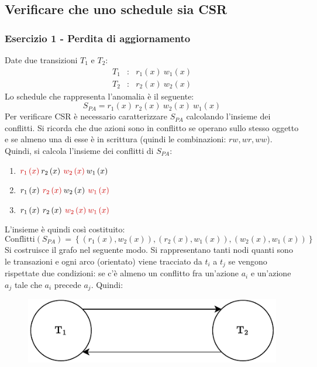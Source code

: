 \documentclass[a4paper]{article}
\begin{document}
	\subsection{Verificare che uno schedule sia CSR}
	
	\subsubsection{Esercizio 1 - Perdita di aggiornamento}
	
	Date due transizioni $T_{1}$ e $T_{2}$:
	\begin{equation*}
		\begin{array}{lll}
			T_{1} &:& r_{1}\left(x\right) \: w_{1}\left(x\right) \\
			T_{2} &:& r_{2}\left(x\right) \: w_{2}\left(x\right)
		\end{array}
	\end{equation*}
	Lo schedule che rappresenta l'anomalia è il seguente:
	\begin{equation*}
		S_{PA} = r_{1}\left(x\right) \: r_{2}\left(x\right) \: w_{2}\left(x\right) \: w_{1}\left(x\right)
	\end{equation*}
	Per verificare CSR è necessario caratterizzare $S_{PA}$ calcolando l'insieme dei conflitti. Si ricorda che due azioni sono in conflitto se operano sullo stesso oggetto e se almeno una di esse è in scrittura (quindi le combinazioni: $rw, wr, ww$). Quindi, si calcola l'insieme dei conflitti di $S_{PA}$:
	\begin{enumerate}
		\item $\textcolor{Red3}{r_{1}\left(x\right)} \: r_{2}\left(x\right) \: \textcolor{Red3}{w_{2}\left(x\right)} \: w_{1}\left(x\right)$
		
		\item $r_{1}\left(x\right) \: \textcolor{Red3}{r_{2}\left(x\right)} \: w_{2}\left(x\right) \: \textcolor{Red3}{w_{1}\left(x\right)}$
		
		\item $r_{1}\left(x\right) \: r_{2}\left(x\right) \: \textcolor{Red3}{w_{2}\left(x\right)} \: \textcolor{Red3}{w_{1}\left(x\right)}$
	\end{enumerate}
	L'insieme è quindi così costituito:
	\begin{equation*}
		\text{Conflitti}\left(S_{PA}\right) = \left\{\left(r_{1}\left(x\right), w_{2}\left(x\right)\right), \left(r_{2}\left(x\right), w_{1}\left(x\right)\right), \left(w_{2}\left(x\right), w_{1}\left(x\right)\right)\right\}
	\end{equation*}
	Si costruisce il grafo nel seguente modo. Si rappresentano tanti nodi quanti sono le transazioni e ogni arco (orientato) viene tracciato da $t_{i}$ a $t_{j}$ se vengono rispettate due condizioni: se c'è almeno un conflitto fra un'azione $a_{i}$ e un'azione $a_{j}$ tale che $a_{i}$ precede $a_{j}$. Quindi:
	\begin{figure}[!htp]
		\centering
		\includegraphics[width=.55\textwidth]{img/CSR-1.pdf}
	\end{figure}
	
\end{document}
